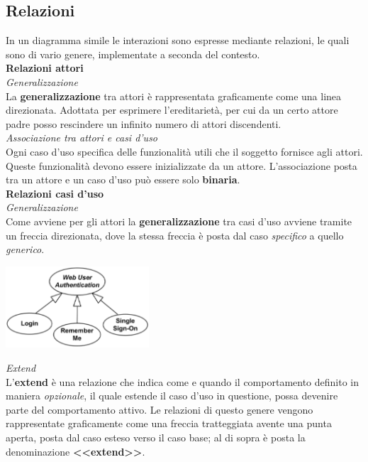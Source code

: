 \documentclass{article}
\begin{document}
\subsection*{Relazioni}
\large
In un diagramma simile le interazioni sono espresse mediante relazioni, le quali sono di vario genere, implementate a seconda del contesto.\vspace*{14pt}\\
\textbf{Relazioni attori}\vspace*{14pt}\\
\textit{Generalizzazione}\\La \textbf{generalizzazione} tra attori è rappresentata graficamente come una linea direzionata. Adottata per esprimere l'ereditarietà, per cui da un certo attore padre posso rescindere un infinito numero di attori discendenti.\vspace*{14pt}\\
\textit{Associazione tra attori e casi d'uso}\\Ogni caso d'uso specifica delle funzionalità utili che il soggetto fornisce agli attori. Queste funzionalità devono essere inizializzate da un attore. L'associazione posta tra un attore e un caso d'uso può essere solo \textbf{binaria}.\vspace*{14pt}\\
\textbf{Relazioni casi d'uso}\vspace*{14pt}\\
\textit{Generalizzazione}\\Come avviene per gli attori la \textbf{generalizzazione} tra casi d'uso avviene tramite un freccia direzionata, dove la stessa freccia è posta dal caso \textit{specifico} a quello \textit{generico}.
\begin{center}
    \includegraphics[width=0.4\textwidth]{foto 3.png}
\end{center}
\textit{Extend}\\L'\textbf{extend} è una relazione che indica come e quando il comportamento definito in maniera \textit{opzionale}, il quale estende il caso d'uso in questione, possa devenire parte del comportamento attivo. Le relazioni di questo genere vengono rappresentate graficamente come una freccia tratteggiata avente una punta aperta, posta dal caso esteso verso il caso base; al di sopra è posta la denominazione \textbf{<<extend>>}.
\end{document}
